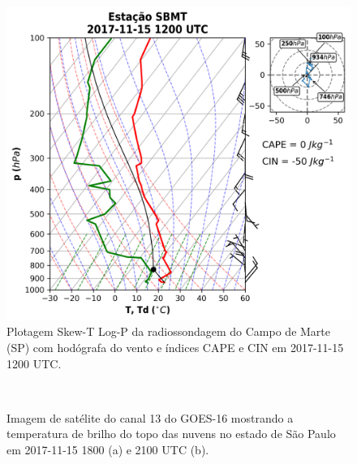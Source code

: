 \begin{figure}[hp]
	\begin{center}
		\caption{Plotagem Skew-T Log-P da radiossondagem do Campo de Marte (SP) com hodógrafa do vento e índices CAPE e CIN em 2017-11-15 1200 UTC.} 
		\label{sondagem_20171115}
		\includegraphics[width=0.75\columnwidth]{../Sounding_Processing/figures/sounding_SBMT2017111512UTC_ptbr.png}
	\end{center}
\end{figure}



\begin{figure}[hp]
	\begin{center}
		\caption{Imagem de satélite do canal 13 do GOES-16 mostrando a temperatura de brilho do topo das nuvens no estado de São Paulo em 2017-11-15 1800 (a) e 2100 UTC (b).} 
		\label{goes16_sp_20171115}
		 \\
	\end{center}
\end{figure}

